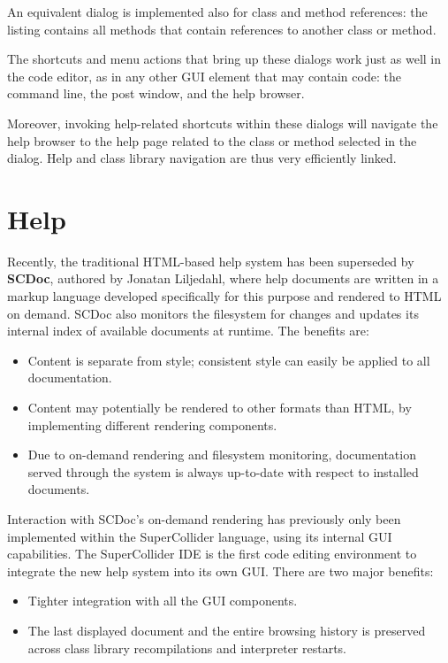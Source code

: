 \documentclass[11pt,a4paper]{article}
\begin{document}
An equivalent dialog is implemented also for class and method references: the listing contains
all methods that contain references to another class or method.

The shortcuts and menu actions that bring up these dialogs work just as well in the code editor,
as in any other GUI element that may contain code: the command line, the post window, and the help
browser.

Moreover, invoking help-related shortcuts within these dialogs will navigate the help browser to the
help page related to the class or method selected in the dialog. Help and class library navigation
are thus very efficiently linked.

\section{Help}

Recently, the traditional HTML-based help system has been superseded by \textbf{SCDoc}, authored by Jonatan Liljedahl,
where help documents are written in a markup language developed specifically for this purpose and rendered to HTML on
demand. SCDoc also monitors the filesystem for changes and updates its internal index of available documents at runtime.
The benefits are:
\begin{itemize}
 \item Content is separate from style; consistent style can easily be applied to all documentation.
 \item Content may potentially be rendered to other formats than HTML, by implementing different rendering components.
 \item Due to on-demand rendering and filesystem monitoring, documentation served through the system is always
up-to-date with respect to installed documents.
\end{itemize}

Interaction with SCDoc's on-demand rendering has previously only been implemented within the SuperCollider language,
using its internal GUI capabilities. The SuperCollider IDE is the first code editing environment to integrate the new
help system into its own GUI. There are two major benefits:
\begin{itemize}
 \item Tighter integration with all the GUI components.
 \item The last displayed document and the entire browsing history is preserved across class library recompilations and
interpreter restarts.
\end{itemize}
\end{document}

